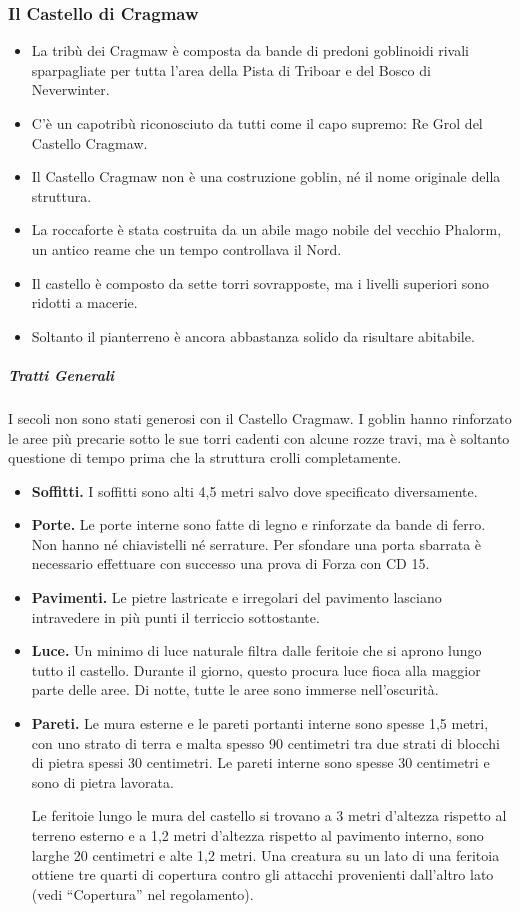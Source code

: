 \documentclass{article}
\begin{document}
\subsubsection{Il Castello di Cragmaw}
\begin{itemize}
    \item La tribù dei Cragmaw è composta da bande di predoni goblinoidi rivali sparpagliate per tutta l’area della Pista di Triboar e del Bosco di Neverwinter.
    \item C'è un capotribù riconosciuto da tutti come il capo supremo: Re Grol del Castello Cragmaw.
    \item Il Castello Cragmaw non è una costruzione goblin, né il nome originale della struttura.
    \item La roccaforte è stata costruita da un abile mago nobile del vecchio Phalorm, un antico reame che un tempo controllava il Nord.
    \item Il castello è composto da sette torri sovrapposte, ma i livelli superiori sono ridotti a macerie.
    \item Soltanto il pianterreno è ancora abbastanza solido da risultare abitabile.
\end{itemize}

\subparagraph{Tratti Generali}
I secoli non sono stati generosi con il Castello Cragmaw. I
goblin hanno rinforzato le aree più precarie sotto le sue torri
cadenti con alcune rozze travi, ma è soltanto questione di
tempo prima che la struttura crolli completamente.
\begin{itemize}
    \item \textbf{Soffitti.} I soffitti sono alti 4,5 metri salvo dove specificato diversamente.
    \item \textbf{Porte.} Le porte interne sono fatte di legno e rinforzate da bande di ferro. Non hanno né chiavistelli né serrature. Per sfondare una porta sbarrata è necessario effettuare con successo una prova di Forza con CD 15.
    \item \textbf{Pavimenti.} Le pietre lastricate e irregolari del pavimento lasciano intravedere in più punti il terriccio sottostante.
    \item \textbf{Luce.} Un minimo di luce naturale filtra dalle feritoie che si aprono lungo tutto il castello. Durante il giorno, questo procura luce fioca alla maggior parte delle aree. Di notte, tutte le aree sono immerse nell'oscurità.
    \item \textbf{Pareti.} Le mura esterne e le pareti portanti interne sono spesse 1,5 metri, con uno strato di terra e malta spesso 90 centimetri tra due strati di blocchi di pietra spessi 30 centimetri. Le pareti interne sono spesse 30 centimetri e sono di pietra lavorata.
    
    Le feritoie lungo le mura del castello si trovano a 3 metri d’altezza rispetto al terreno esterno e a 1,2 metri d'altezza rispetto al pavimento interno, sono larghe 20 centimetri e alte 1,2 metri. Una creatura su un lato di una feritoia ottiene tre quarti di copertura contro gli attacchi provenienti dall’altro lato (vedi “Copertura” nel regolamento).
\end{itemize}
\end{document}

